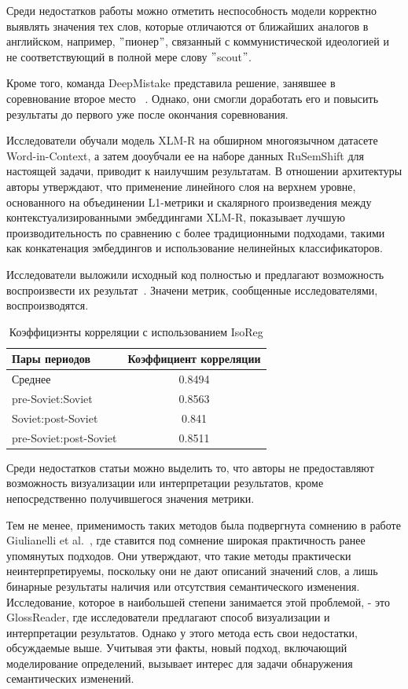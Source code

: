 \documentclass[LI,VKR]{HSEUniversity}
\begin{document}
Среди недостатков работы можно отметить неспособность модели корректно выявлять
значения тех слов, которые отличаются от ближайших аналогов в английском, например,
\("\)пионер\("\), связанный с коммунистической идеологией и не соответствующий в полной мере
слову \("\)scout\("\).

Кроме того, команда DeepMistake представила решение, занявшее в соревнование второе место
~\cite{DeepMistake}.
Однако, они смогли доработать его и повысить результаты до первого уже после окончания
соревнования.

Исследователи обучали модель XLM-R на обширном многоязычном датасете Word-in-Context,
а затем дооубчали ее на наборе данных RuSemShift для настоящей задачи,
приводит к наилучшим результатам.
В отношении архитектуры авторы утверждают, что применение линейного слоя на верхнем уровне,
основанного на объединении L1-метрики и скалярного произведения между контекстуализированными
эмбеддингами XLM-R, показывает лучшую производительность по сравнению с
более традиционными подходами, такими как конкатенация эмбеддингов и
использование нелинейных классификаторов.

Исследователи выложили исходный код полностью и предлагают возможность воспроизвести их
результат~\cite{DeepMistakeGitHub}.
Значени метрик, сообщенные исследователями, воспроизводятся.

\begin{table}[htbp]
\centering
\caption{Коэффициэнты корреляции с использованием IsoReg}
\begin{tabular}{lc}
\hline
Пары периодов                  & Коэффициент корреляции \\
\hline
Среднее            & 0.8494                  \\
pre-Soviet:Soviet           & 0.8563                  \\
Soviet:post-Soviet          & 0.841                  \\
pre-Soviet:post-Soviet      & 0.8511                  \\
\hline
\end{tabular}
\end{table}

Среди недостатков статьи можно выделить то, что авторы не предоставляют возможность визуализации
или интерпретации результатов, кроме непосредственно получившегося значения метрики.

Тем не менее, применимость таких методов была подвергнута сомнению в работе
Giulianelli et al.~\cite{DefinitionGenerationMainArticle},
где ставится под сомнение широкая практичность ранее упомянутых подходов.
Они утверждают, что такие методы практически неинтерпретируемы,
поскольку они не дают описаний значений слов,
а лишь бинарные результаты наличия или отсутствия семантического изменения.
Исследование, которое в наибольшей степени занимается этой проблемой, - это GlossReader,
где исследователи предлагают способ визуализации и интерпретации результатов.
Однако у этого метода есть свои недостатки, обсуждаемые выше.
Учитывая эти факты, новый подход, включающий моделирование определений,
вызывает интерес для задачи обнаружения семантических изменений.
\end{document}
